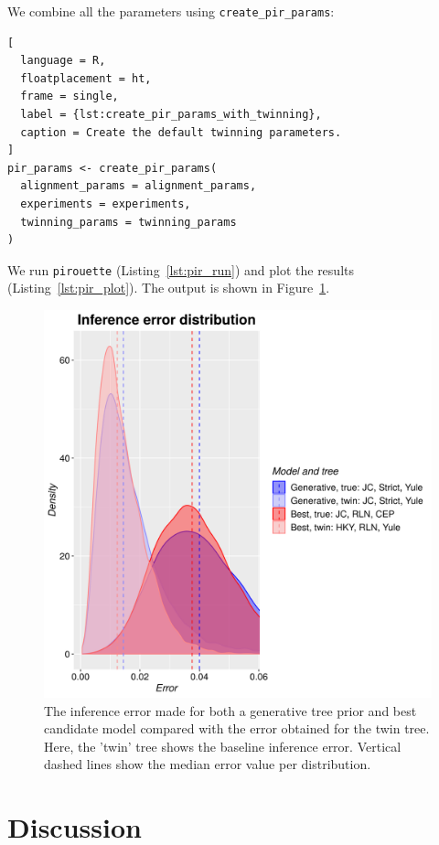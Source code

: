 We combine all the parameters using \verb;create_pir_params;:

\begin{lstlisting}[
  language = R,
  floatplacement = ht,
  frame = single,
  label = {lst:create_pir_params_with_twinning},
  caption = Create the default twinning parameters.
]
pir_params <- create_pir_params(
  alignment_params = alignment_params,
  experiments = experiments,
  twinning_params = twinning_params
)
\end{lstlisting}

We run \verb;pirouette; (Listing~\ref{lst:pir_run}) 
and plot the results (Listing~\ref{lst:pir_plot}).
The output is shown in Figure~\ref{fig:example_3}.

\begin{figure}[H]
  \includegraphics[width=\textwidth]{example_6/errors.png}
  \caption{
    The inference error made 
    for both a generative tree prior and best candidate model
    compared with the error obtained for the twin tree.
    Here, the 'twin' tree shows the baseline inference error.
    Vertical dashed lines show the median error value per distribution.
  }
  \label{fig:example_3}
\end{figure}

\section{Discussion}

